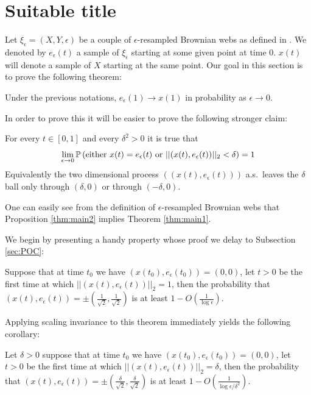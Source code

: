 {
\newcommand{\eeps}{e_\epsilon}

\section{Suitable title}
Let $\xi_\epsilon=(X,Y,\epsilon)$ be a couple of $\epsilon$-resampled
Brownian webs as defined in . We denoted by $\eeps(t)$ a
sample of $\xi_\epsilon$ starting at some given point at time
$0$. $x(t)$ will denote a sample of $X$ starting at the same
point. Our goal in this section is to prove the following theorem:

\begin{theorem}\label{thm:main1}
Under the previous notations, $\eeps(1) \to x(1)$ in probability
as $\epsilon \to 0$.
\end{theorem}

\newcommand{\radiussq}{\delta^2}
\newcommand{\radius}{\delta}
\newcommand{\twonorm}[1]{||#1||_2}

\newcommand{\twodproc}[1]{(x(#1), \eeps(#1))}

In order to prove this it will be easier to prove the following
stronger claim:
\begin{propos}\label{thm:main2}
For every $t\in[0,1]$ and every $\radiussq>0$ it is true that
$$\ds \lim_{\epsilon \rightarrow 0}\P\left(\text{either } x(t)=\eeps(t)
\text{ or } \twonorm{\twodproc{t}} <\radius\right)=1$$
Equivalently the two dimensional process $(\twodproc{t})$
a.s.\ leaves the $\radius$ ball only through
$(\radius,0)$ or through
$(-\radius,0)$.
\end{propos}

One can easily see from the definition of $\epsilon$-resampled
Brownian webs that Proposition \ref{thm:main2} implies Theorem
\ref{thm:main1}.

 We begin by presenting a handy property whose proof
we delay to Subsection \ref{sec:POC}:

\begin{propos}\label{thm:no-escape}
Suppose that at time $t_0$ we have
$\twodproc{t_0}=(0,0)$, let $t>0$ be the first time at which
$\twonorm{\twodproc{t}}=1$, then the probability
that $\twodproc{t} =\pm(\frac{1}{\sqrt2},\frac{1}{\sqrt2})$ is at least $1-O(\frac1{\log\epsilon})$.
\end{propos}

Applying scaling invariance to this theorem immediately yields the
following corollary:
\begin{cor}\label{cor:cor1}
Let $\radius>0$ suppose that at time $t_0$ we have $\twodproc{t_0}=(0,0)$, let
$t>0$ be the first time at which
$\twonorm{\twodproc{t}} = \radius$, then the probability
that $\twodproc{t} =\pm(\frac{\radius}{\sqrt2},\frac{\radius}{\sqrt2})$ is at least
$1-O(\frac{1}{\log\epsilon/\radiussq})$.
\end{cor}

}
